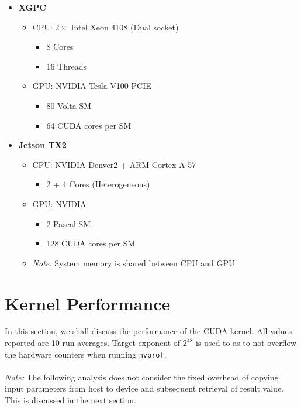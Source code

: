 \documentclass[a4paper,12pt]{article}
\begin{document}
\begin{itemize}
  \item \textbf{XGPC}
  \begin{itemize}
    \item CPU: $2 \times$ Intel Xeon 4108 (Dual socket)
    \begin{itemize}
      \item 8 Cores
      \item 16 Threads
    \end{itemize}
    \item GPU: NVIDIA Tesla V100-PCIE
    \begin{itemize}
      \item 80 Volta SM
      \item 64 CUDA cores per SM
    \end{itemize}
  \end{itemize}
  \item \textbf{Jetson TX2}
  \begin{itemize}
    \item CPU: NVIDIA Denver2 + ARM Cortex A-57
    \begin{itemize}
      \item 2 + 4 Cores (Heterogeneous)
    \end{itemize}
    \item GPU: NVIDIA
    \begin{itemize}
      \item 2 Pascal SM
      \item 128 CUDA cores per SM
    \end{itemize}
    \item \textit{Note:} System memory is shared between CPU and GPU
  \end{itemize}
\end{itemize}

\section{Kernel Performance}

In this section, we shall discuss the performance of the CUDA kernel. All values reported are 10-run averages. Target exponent of $2^{48}$ is used to as to not overflow the hardware counters when running \texttt{nvprof}.\\
\\
\textit{Note:} The following analysis does not consider the fixed overhead of copying input parameters from host to device and subsequent retrieval of result value. This is discussed in the next section.
\end{document}
